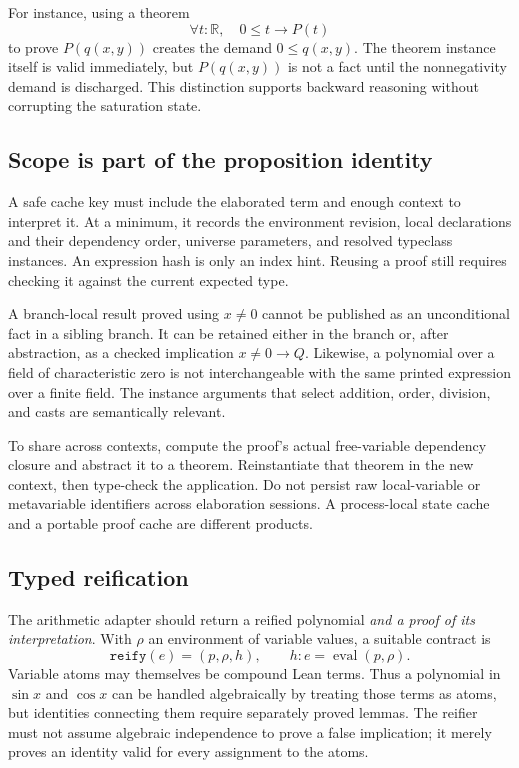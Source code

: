 \documentclass[11pt,letterpaper]{article}
\newcommand{\Lean}{\textsf{Lean}}
\newcommand{\R}{\mathbb{R}}
\theoremstyle{definition}
\theoremstyle{remark}
\begin{document}
For instance, using a theorem
\[
\forall t:\R,\quad 0\leq t\to P(t)
\]
to prove $P(q(x,y))$ creates the demand $0\leq q(x,y)$. The theorem instance itself is valid immediately, but $P(q(x,y))$ is not a fact until the nonnegativity demand is discharged. This distinction supports backward reasoning without corrupting the saturation state.

\subsection{Scope is part of the proposition identity}
A safe cache key must include the elaborated term and enough context to interpret it. At a minimum, it records the environment revision, local declarations and their dependency order, universe parameters, and resolved typeclass instances. An expression hash is only an index hint. Reusing a proof still requires checking it against the current expected type.

A branch-local result proved using $x\ne0$ cannot be published as an unconditional fact in a sibling branch. It can be retained either in the branch or, after abstraction, as a checked implication $x\ne0\to Q$. Likewise, a polynomial over a field of characteristic zero is not interchangeable with the same printed expression over a finite field. The instance arguments that select addition, order, division, and casts are semantically relevant.

To share across contexts, compute the proof's actual free-variable dependency closure and abstract it to a theorem. Reinstantiate that theorem in the new context, then type-check the application. Do not persist raw local-variable or metavariable identifiers across elaboration sessions. A process-local state cache and a portable proof cache are different products.

\subsection{Typed reification}
The arithmetic adapter should return a reified polynomial \emph{and a proof of its interpretation}. With $\rho$ an environment of variable values, a suitable contract is
\[
\texttt{reify}(e)=(p,\rho,h),\qquad
h:e=\operatorname{eval}(p,\rho).
\]
Variable atoms may themselves be compound \Lean{} terms. Thus a polynomial in $\sin x$ and $\cos x$ can be handled algebraically by treating those terms as atoms, but identities connecting them require separately proved lemmas. The reifier must not assume algebraic independence to prove a false implication; it merely proves an identity valid for every assignment to the atoms.
\end{document}

